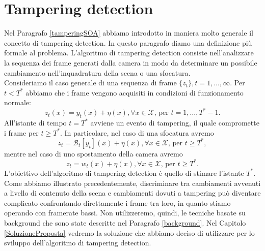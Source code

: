 \section{Tampering detection}
\label{tamperingDef}
Nel Paragrafo \ref{tamperingSOA} abbiamo introdotto in maniera molto generale il concetto di tampering detection. 
In questo paragrafo diamo una definizione pi\`u formale al problema.
L'algoritmo di tampering detection consiste nell'analizzare la sequenza dei frame generati dalla camera in modo da determinare un possibile cambiamento nell'inquadratura della scena o una sfocatura.\\
Consideriamo il caso generale di una sequenza di frame $\{z_t\}, t=1,\dots,\infty$. 
Per $t<T^*$ abbiamo che i frame vengono acquisiti in condizioni di funzionamento normale:
\[ z_t(x)=y_t(x) + \eta(x), \forall x \in \mathcal{X} \mbox{, per } t=1,\dots , T^*-1. \] 
All'istante di tempo $t = T^*$ avviene un evento di tampering, il quale compromette i frame per $t\geq T^*$.  
In particolare, nel caso di una sfocatura avremo
\[ z_t = \mathcal{B}_t[y_t](x) + \eta(x), \forall x \in \mathcal{X} \mbox{, per } t \geq T^*,\]
mentre nel caso di uno spostamento della camera avremo
\[ z_t = w_t(x) + \eta(x), \forall x \in \mathcal{X} \mbox{, per } t \geq T^*. \]
L'obiettivo dell'algoritmo di tampering detection \`e quello di stimare l'istante $T^*$. \\
Come abbiamo illustrato precedentemente, discriminare tra cambiamenti avvenuti a livello di contenuto della scena e cambiamenti dovuti a tampering pu\`o diventare complicato confrontando direttamente i frame tra loro, in quanto stiamo operando con framerate bassi.
Non utilizzeremo, quindi, le tecniche basate su background che sono state descritte nel Paragrafo \ref{background}.
Nel Capitolo \ref{SoluzioneProposta} vedremo la soluzione che abbiamo deciso di utilizzare per lo sviluppo dell'algoritmo di tampering detection. 